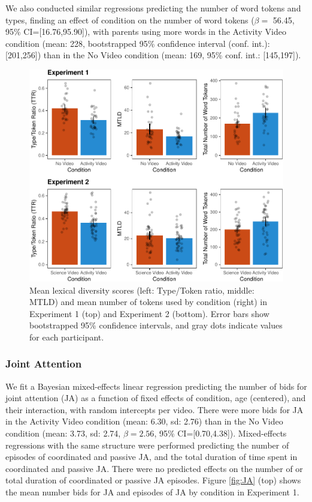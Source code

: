 \documentclass[man,floatsintext]{apa6}
\begin{document}
We also conducted similar regressions predicting the number of word tokens and types, finding an effect of condition on the number of word tokens (\(\beta=\) 56.45, 95\% CI={[}16.76,95.90{]}), with parents using more words in the Activity Video condition (mean: 228, bootstrapped 95\% confidence interval (conf. int.): {[}201,256{]}) than in the No Video condition (mean: 169, 95\% conf. int.: {[}145,197{]}).

\begin{figure}[H]

{\centering \includegraphics{figs/fig-lexdiv-1} 

}

\caption{\label{fig:lexdiv} Mean lexical diversity scores (left: Type/Token ratio, middle: MTLD) and mean number of tokens used by condition (right) in Experiment 1 (top) and Experiment 2 (bottom). Error bars show bootstrapped 95\% confidence intervals, and gray dots indicate values for each participant.}\label{fig:fig-lexdiv}
\end{figure}

\hypertarget{joint-attention}{%
\subsubsection{Joint Attention}\label{joint-attention}}

We fit a Bayesian mixed-effects linear regression predicting the number of bids for joint attention (JA) as a function of fixed effects of condition, age (centered), and their interaction, with random intercepts per video.
There were more bids for JA in the Activity Video condition (mean: 6.30, sd: 2.76) than in the No Video condition (mean: 3.73, sd: 2.74, \(\beta=2.56\), 95\% CI={[}0.70,4.38{]}).
Mixed-effects regressions with the same structure were performed predicting the number of episodes of coordinated and passive JA, and the total duration of time spent in coordinated and passive JA.
There were no predicted effects on the number of or total duration of coordinated or passive JA episodes.
Figure \ref{fig:JA} (top) shows the mean number bids for JA and episodes of JA by condition in Experiment 1.
\end{document}

